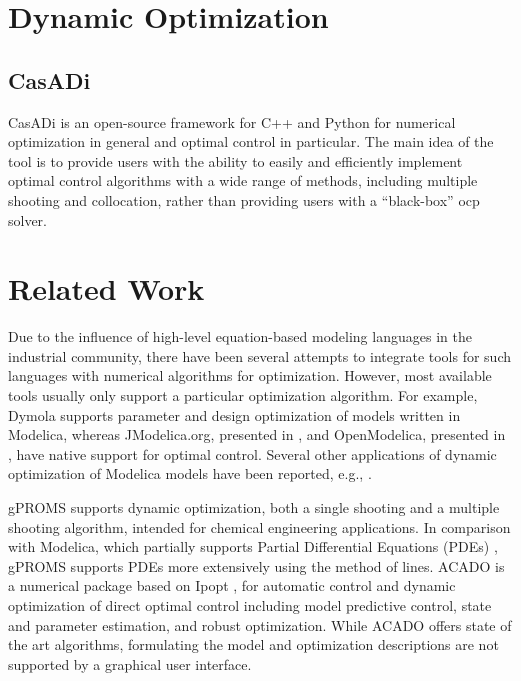 \section{Dynamic Optimization}
\label{sec:dynamicoptimization}

\subsection{CasADi}
\label{sec:casadi}

CasADi \cite{casadi} is an open-source framework for C++ and Python for numerical optimization in general and optimal control in particular. The main idea of the tool is to provide users with the ability to easily and efficiently implement optimal control algorithms with a wide range of methods, including multiple shooting and collocation, rather than providing users with a “black-box” \acrshort{ocp} solver.

\section{Related Work}
\label{sec:relatedwork}

Due to the influence of high-level equation-based modeling languages in the industrial community, there have been several attempts to integrate tools for such languages with numerical algorithms for optimization. However, most available tools usually only support a particular optimization algorithm. For example, Dymola supports parameter and design optimization of models written in Modelica, whereas JModelica.org, presented in \cite{akesson}, and OpenModelica, presented in \cite{bernhard}, have native support for optimal control. Several other applications of dynamic optimization of Modelica models have been reported, e.g., \cite{relatedworkjohan,relatedworkfranke, relatedworklarson,relatedworkjan, relatedworkprolss}. 

gPROMS \cite{gproms} supports dynamic optimization, both a single shooting and a multiple shooting algorithm, intended for chemical engineering applications. In comparison with Modelica, which partially supports Partial Differential Equations (PDEs) \cite{pdelevon,pdelevonpeter}, gPROMS supports PDEs more extensively using the method of lines. ACADO \cite{acado,acadoboris} is a numerical package based on Ipopt \cite{wachter,ipopt}, for automatic control and dynamic optimization of direct optimal control including model predictive control, state and parameter estimation, and robust optimization. While ACADO offers state of the art algorithms, formulating the model and optimization descriptions are not supported by a graphical user interface. 

